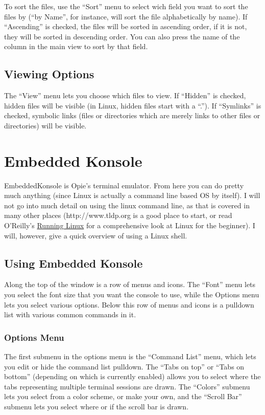 \documentclass[12pt,letterpaper,oneside, openany]{book} \usepackage[latin1] {inputenc}
\begin{document}
To sort the files, use the ``Sort'' menu to select wich field you want to sort the files by (``by Name'', for instance, will sort the file alphabetically by name). If ``Ascending'' is checked, the files will be sorted in ascending order, if it is not, they will be sorted in descending order.  You can also press the name of the column in the main view to sort by that field.

\section{Viewing Options}

The ``View'' menu lets you choose which files to view. If ``Hidden'' is checked, hidden files will be visible (in Linux, hidden files start with a ``.''). If ``Symlinks'' is checked, symbolic links (files or directories which are merely links to other files or directories) will be visible.

\chapter{Embedded Konsole}
EmbeddedKonsole is Opie's terminal emulator.  From here you can do pretty much anything (since Linux is actually a command line based OS by itself).  I will not go into much detail on using the linux command line, as that is covered in many other places (http://www.tldp.org is a good place to start, or read O'Reilly's \underline{Running Linux} for a comprehensive look at Linux for the beginner).  I will, however, give a quick overview of using a Linux shell.

\section{Using Embedded Konsole}

Along the top of the window is a row of menus and icons.  The ``Font'' menu lets you select the font size that you want the console to use, while the Options menu lets you select various options.  Below this row of menus and icons is a pulldown list with various common commands in it.

\subsection{Options Menu}

The first submenu in the options menu is the ``Command List'' menu, which lets you edit or hide the command list pulldown.  The ``Tabs on top'' or ``Tabs on bottom'' (depending on which is currently enabled) allows you to select where the tabs representing multiple terminal sessions are drawn.  The ``Colors'' submenu lets you select from a color scheme, or make your own, and the ``Scroll Bar'' submenu lets you select where or if the scroll bar is drawn.
\end{document}
